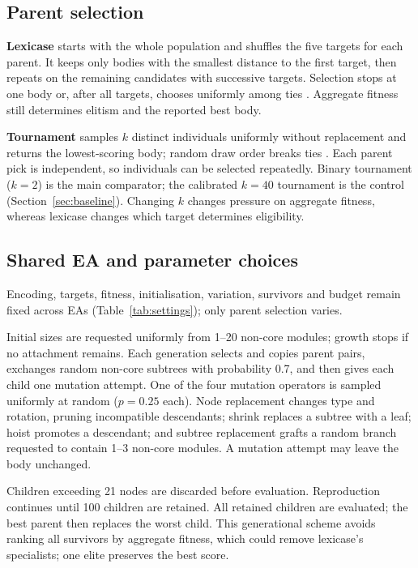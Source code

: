 \documentclass[sigconf]{acmart}
\begin{document}
\subsection{Parent selection}
\textbf{Lexicase} starts with the whole population and shuffles the five targets for each parent. It keeps only bodies with the smallest distance to the first target, then repeats on the remaining candidates with successive targets. Selection stops at one body or, after all targets, chooses uniformly among ties \cite{spector2012,helmuth2015}. Aggregate fitness still determines elitism and the reported best body.

\textbf{Tournament} samples $k$ distinct individuals uniformly without replacement and returns the lowest-scoring body; random draw order breaks ties \cite{eiben2015}. Each parent pick is independent, so individuals can be selected repeatedly. Binary tournament ($k=2$) is the main comparator; the calibrated $k=40$ tournament is the control (Section~\ref{sec:baseline}). Changing $k$ changes pressure on aggregate fitness, whereas lexicase changes which target determines eligibility.

\subsection{Shared EA and parameter choices}
Encoding, targets, fitness, initialisation, variation, survivors and budget remain fixed across EAs (Table~\ref{tab:settings}); only parent selection varies.

Initial sizes are requested uniformly from 1--20 non-core modules; growth stops if no attachment remains. Each generation selects and copies parent pairs, exchanges random non-core subtrees with probability 0.7, and then gives each child one mutation attempt. One of the four mutation operators is sampled uniformly at random ($p=0.25$ each). Node replacement changes type and rotation, pruning incompatible descendants;
shrink replaces a subtree with a leaf; hoist promotes a descendant; and subtree replacement grafts a random branch requested to contain 1--3 non-core modules. A mutation attempt may leave the body unchanged.

Children exceeding 21 nodes are discarded before evaluation. Reproduction continues until 100 children are retained. All retained children are evaluated; the best parent then replaces the worst child. This generational scheme avoids ranking all survivors by aggregate fitness, which could remove lexicase's specialists; one elite preserves the best score.
\end{document}
